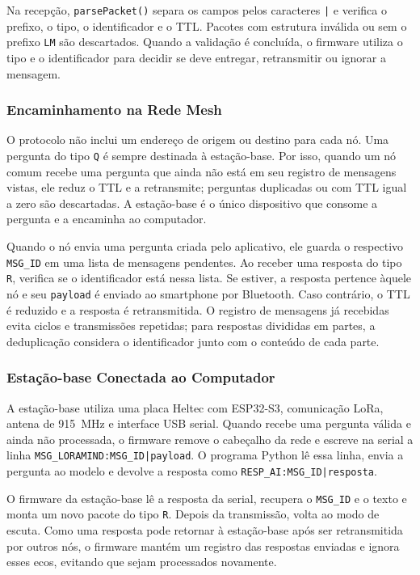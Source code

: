 \documentclass[12pt]{article}
\begin{document}
Na recepção, \texttt{parsePacket()} separa os campos pelos caracteres \texttt{|} e verifica o prefixo, o tipo, o identificador e o TTL. Pacotes com estrutura inválida ou sem o prefixo \texttt{LM} são descartados. Quando a validação é concluída, o firmware utiliza o tipo e o identificador para decidir se deve entregar, retransmitir ou ignorar a mensagem.

\subsubsection{Encaminhamento na Rede Mesh}

O protocolo não inclui um endereço de origem ou destino para cada nó. Uma pergunta do tipo \texttt{Q} é sempre destinada à estação-base. Por isso, quando um nó comum recebe uma pergunta que ainda não está em seu registro de mensagens vistas, ele reduz o TTL e a retransmite; perguntas duplicadas ou com TTL igual a zero são descartadas. A estação-base é o único dispositivo que consome a pergunta e a encaminha ao computador.

Quando o nó envia uma pergunta criada pelo aplicativo, ele guarda o respectivo \texttt{MSG\_ID} em uma lista de mensagens pendentes. Ao receber uma resposta do tipo \texttt{R}, verifica se o identificador está nessa lista. Se estiver, a resposta pertence àquele nó e seu \texttt{payload} é enviado ao smartphone por Bluetooth. Caso contrário, o TTL é reduzido e a resposta é retransmitida. O registro de mensagens já recebidas evita ciclos e transmissões repetidas; para respostas divididas em partes, a deduplicação considera o identificador junto com o conteúdo de cada parte.

\subsubsection{Estação-base Conectada ao Computador}

A estação-base utiliza uma placa Heltec com ESP32-S3, comunicação LoRa, antena de 915~MHz e interface USB serial. Quando recebe uma pergunta válida e ainda não processada, o firmware remove o cabeçalho da rede e escreve na serial a linha \texttt{MSG\_LORAMIND:MSG\_ID|payload}. O programa Python lê essa linha, envia a pergunta ao modelo e devolve a resposta como \texttt{RESP\_AI:MSG\_ID|resposta}.

O firmware da estação-base lê a resposta da serial, recupera o \texttt{MSG\_ID} e o texto e monta um novo pacote do tipo \texttt{R}. Depois da transmissão, volta ao modo de escuta. Como uma resposta pode retornar à estação-base após ser retransmitida por outros nós, o firmware mantém um registro das respostas enviadas e ignora esses ecos, evitando que sejam processados novamente.
\end{document}
